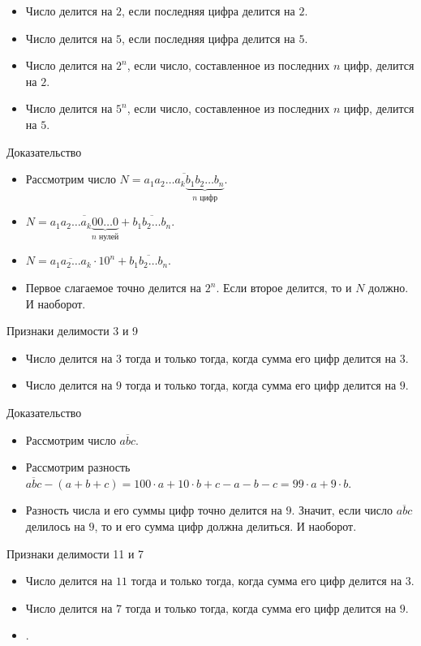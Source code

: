 \documentclass[17pt]{extarticle}
\newcommand{\newslide}[1]{\newpage \begin{center} \large #1 \end{center}}
\begin{document}
\begin{itemize}\itemsep=0mm
\item Число делится на $2$, если последняя цифра делится на $2$.
\item Число делится на $5$, если последняя цифра делится на $5$.
\item Число делится на $2^n$, если число, составленное из последних $n$ цифр, делится на $2$.
\item Число делится на $5^n$, если число, составленное из последних $n$ цифр, делится на $5$.
\end{itemize}

\newslide{Доказательство}\vspace{-7mm}

\begin{itemize}\itemsep=0mm
\item Рассмотрим число $N = \overline{a_1a_2\ldots a_k\underbrace{b_1b_2\ldots b_n}_{n \text{ цифр}}}$.
\item $N = \overline{a_1a_2\ldots a_k\underbrace{00\ldots 0}_{n \text{ нулей}}} + \overline{b_1b_2\ldots b_n}$.
\item $N = \overline{a_1a_2\ldots a_k}\cdot10^n + \overline{b_1b_2\ldots b_n}$.
\item Первое слагаемое точно делится на $2^n$. Если второе делится, то и $N$ должно. И наоборот.
\end{itemize}

\newslide{Признаки делимости 3 и 9}

\begin{itemize}
\item Число делится на $3$ тогда и только тогда, когда сумма его цифр делится на $3$.
\item Число делится на $9$ тогда и только тогда, когда сумма его цифр делится на $9$.
\end{itemize}

\newslide{Доказательство}

\begin{itemize}
\item Рассмотрим число $\overline{abc}$.
\item Рассмотрим разность $\overline{abc} - (a+b+c) = 100\cdot a + 10\cdot b + c - a-b-c = 99\cdot a + 9\cdot b$.
\item Разность числа и его суммы цифр точно делится на $9$. Значит, если число $\overline{abc}$ делилось на $9$, то и его сумма цифр должна делиться. И наоборот.
\end{itemize}

\newslide{Признаки делимости 11 и 7}

\begin{itemize}
\item Число делится на $11$ тогда и только тогда, когда сумма его цифр делится на $3$.
\item Число делится на $7$ тогда и только тогда, когда сумма его цифр делится на $9$.
\end{itemize}

\newslide{}

\begin{itemize}
\item .
\end{itemize}
\end{document}

